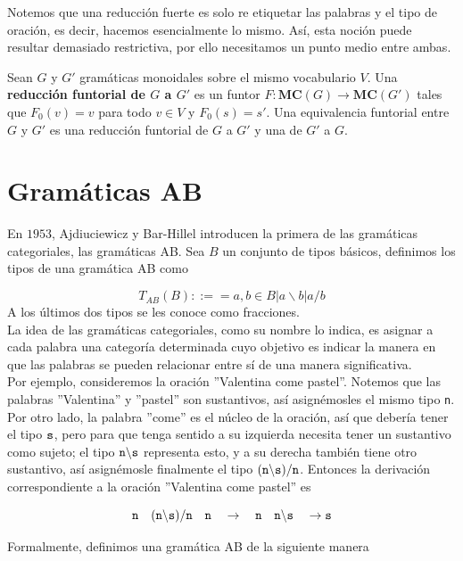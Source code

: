 \documentclass[../main.tex]{subfiles}
\begin{document}
	\noindent Notemos que una reducción fuerte es solo re etiquetar las palabras y el tipo de oración, es decir, hacemos esencialmente lo mismo. Así, esta noción puede resultar demasiado restrictiva, por ello necesitamos un punto medio entre ambas.
	
	\begin{dfn}
		Sean $G$ y $G'$ gramáticas monoidales sobre el mismo vocabulario $V$. Una \textbf{reducción funtorial de $G$ a $G'$} es un funtor $F: \textbf{MC}(G) \to \textbf{MC}(G')$ tales que $F_0(v)=v$ para todo $v \in V$ y $F_0(s)=s'$. Una equivalencia funtorial entre $G$ y $G'$ es una reducción funtorial de $G$ a $G'$ y una de $G'$ a $G$. 
	\end{dfn}
	
	\section{Gramáticas AB}
	
	En $1953$, Ajdiuciewicz y Bar-Hillel introducen la primera de las gramáticas categoriales, las gramáticas AB. Sea $B$  un conjunto de tipos básicos, definimos los tipos de una gramática AB como
	
	$$T_{AB}(B)::==a,b \in B | a \backslash b | a/b$$
	A los últimos dos tipos se les conoce como fracciones. \\
	La idea de las gramáticas categoriales, como su nombre lo indica, es asignar a cada palabra una categoría determinada cuyo objetivo es indicar la manera en que las palabras se pueden relacionar entre sí de una manera significativa. \\
	
	Por ejemplo, consideremos la oración ''Valentina come pastel''. Notemos que las palabras ''Valentina'' y ''pastel'' son sustantivos, así asignémosles el mismo tipo {\tt{n}}. Por otro lado, la palabra ''come'' es el núcleo de la oración, así que debería tener el tipo $\tt{s}$, pero para que tenga sentido a su izquierda necesita tener un sustantivo como sujeto; el tipo $\tt{n\backslash s}$ representa esto, y a su derecha también tiene otro sustantivo, así asignémosle finalmente el tipo $(\tt{n\backslash s})/n$. Entonces la derivación correspondiente a la oración ''Valentina come pastel'' es
	
	$$\tt{n} \quad (\tt{n\backslash s})/n \quad \tt{n} \quad \to \quad \tt{n} \quad \tt{n\backslash s} \quad \to s$$
	
	Formalmente, definimos una gramática AB de la siguiente manera
	
\end{document}
